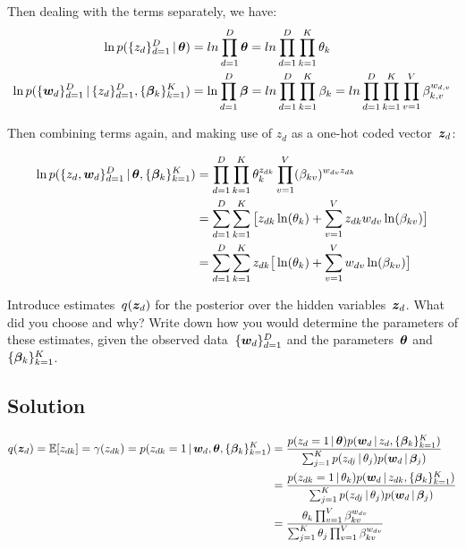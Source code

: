 \documentclass[submit]{harvardml}
\begin{document}
\noindent
Then dealing with the terms separately, we have:
\begin{align*}
\ln p(\{z_d\}^D_{d=1} \,|\, \boldsymbol{\theta}) & = ln \prod_{d=1}^{D} \boldsymbol{\theta} = ln \prod_{d=1}^{D} \prod_{k=1}^{K} \theta_k \ \\
\ln p(\{\boldsymbol{w}_d\}^D_{d=1} \,|\, \{z_d\}^D_{d=1}, \{\boldsymbol{\beta}_k\}^K_{k=1}) & = \ln \prod_{d=1}^{D} \boldsymbol{\beta} =  ln \prod_{d=1}^{D} \prod_{k=1}^{K} \beta_k 
= ln \prod_{d=1}^{D} \prod_{k=1}^{K} \prod_{v=1}^{V} \beta_{k,v}^{w_{d,v}}
\end{align*}

\noindent
Then combining terms again, and making use of $z_d$ as a one-hot coded vector~$\boldsymbol{z}_d$:

\begin{align*}
\ln p(\{z_d,\boldsymbol{w}_d\}^D_{d=1} \,|\,\boldsymbol{\theta}, \{\boldsymbol{\beta}_k\}^K_{k=1}) & = \prod_{d=1}^{D} \prod_{k=1}^{K} \theta_k^{z_{dk}} \prod_{v=1}^{V} (\beta_{kv})^{w_{dv}z_{dk}} \\
& = \sum_{d=1}^{D} \sum_{k=1}^{K} \big[ z_{dk} \ln (\theta_k) + \sum_{v=1}^{V} z_{dk} w_{dv} \ln (\beta_{kv}) \big] \\
& = \sum_{d=1}^{D} \sum_{k=1}^{K}  z_{dk} \big[\ln (\theta_k) + \sum_{v=1}^{V} w_{dv} \ln (\beta_{kv}) \big]
\end{align*}




\newpage
\begin{problem}

Introduce estimates~$q(\boldsymbol{z}_d)$ for the posterior over the hidden variables~$\boldsymbol{z}_d$.  What did you choose and why?  Write down how you would determine the parameters of these estimates, given the observed data~$\{\boldsymbol{w}_d\}^D_{d=1}$ and the parameters~$\boldsymbol{\theta}$ and~$\{\boldsymbol{\beta}_k\}^K_{k=1}$.

\end{problem}
\subsection*{Solution}

\begin{align*}
q(\boldsymbol{z}_d) = \mathbb{E} [z_{dk}] = \gamma(z_{dk}) = p(z_{dk}=1 \,|\, \boldsymbol{w}_d, \boldsymbol{\theta}, \{\boldsymbol{\beta}_k\}_{k=1}^{K}) & = \frac{p(z_{d}=1 \,|\, \boldsymbol{\theta}) p(\boldsymbol{w}_d \,|\, z_{d},\{\boldsymbol{\beta}_k\}_{k=1}^{K})}{\sum_{j=1}^{K}p(z_{dj} \,|\, \theta_j) p(\boldsymbol{w}_d \,|\, \boldsymbol{\beta}_j)} \\
& = \frac{p(z_{dk}=1 \,|\, \theta_k) p(\boldsymbol{w}_d \,|\, z_{dk},\{\boldsymbol{\beta}_k\}_{k=1}^{K})}{\sum_{j=1}^{K}p(z_{dj} \,|\, \theta_j) p(\boldsymbol{w}_d \,|\, \boldsymbol{\beta}_j)} \\
& = \frac{\theta_k \prod_{v=1}^{V} \beta_{kv}^{w_{dv}}} {\sum_{j=1}^{K} \theta_j \prod_{v=1}^{V} \beta_{kv}^{w_{dv}}}
\end{align*}
\end{document}

